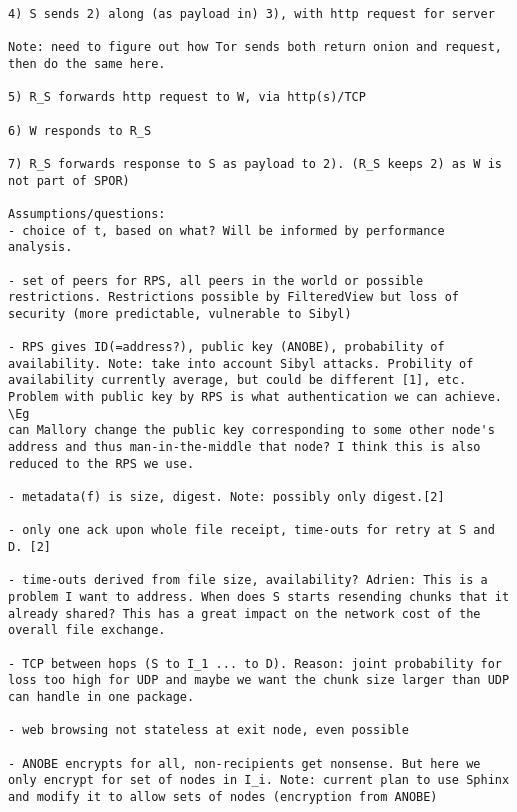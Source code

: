 \begin{verbatim}
4) S sends 2) along (as payload in) 3), with http request for server

Note: need to figure out how Tor sends both return onion and request, then do the same here.

5) R_S forwards http request to W, via http(s)/TCP

6) W responds to R_S

7) R_S forwards response to S as payload to 2). (R_S keeps 2) as W is not part of SPOR) 

Assumptions/questions:
- choice of t, based on what? Will be informed by performance analysis.

- set of peers for RPS, all peers in the world or possible restrictions. Restrictions possible by FilteredView but loss of security (more predictable, vulnerable to Sibyl)

- RPS gives ID(=address?), public key (ANOBE), probability of availability. Note: take into account Sibyl attacks. Probility of availability currently average, but could be different [1], etc. Problem with public key by RPS is what authentication we can achieve. \Eg 
can Mallory change the public key corresponding to some other node's 
address and thus man-in-the-middle that node? I think this is also 
reduced to the RPS we use.

- metadata(f) is size, digest. Note: possibly only digest.[2]

- only one ack upon whole file receipt, time-outs for retry at S and D. [2]

- time-outs derived from file size, availability? Adrien: This is a problem I want to address. When does S starts resending chunks that it already shared? This has a great impact on the network cost of the overall file exchange.

- TCP between hops (S to I_1 ... to D). Reason: joint probability for loss too high for UDP and maybe we want the chunk size larger than UDP can handle in one package.

- web browsing not stateless at exit node, even possible

- ANOBE encrypts for all, non-recipients get nonsense. But here we only encrypt for set of nodes in I_i. Note: current plan to use Sphinx and modify it to allow sets of nodes (encryption from ANOBE)



\end{verbatim}
